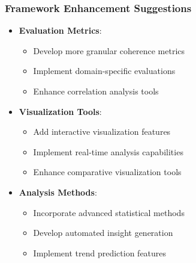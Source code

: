 \subsubsection{Framework Enhancement Suggestions}
\begin{itemize}
    \item \textbf{Evaluation Metrics}:
    \begin{itemize}
        \item Develop more granular coherence metrics
        \item Implement domain-specific evaluations
        \item Enhance correlation analysis tools
    \end{itemize}
    \item \textbf{Visualization Tools}:
    \begin{itemize}
        \item Add interactive visualization features
        \item Implement real-time analysis capabilities
        \item Enhance comparative visualization tools
    \end{itemize}
    \item \textbf{Analysis Methods}:
    \begin{itemize}
        \item Incorporate advanced statistical methods
        \item Develop automated insight generation
        \item Implement trend prediction features
    \end{itemize}
\end{itemize}